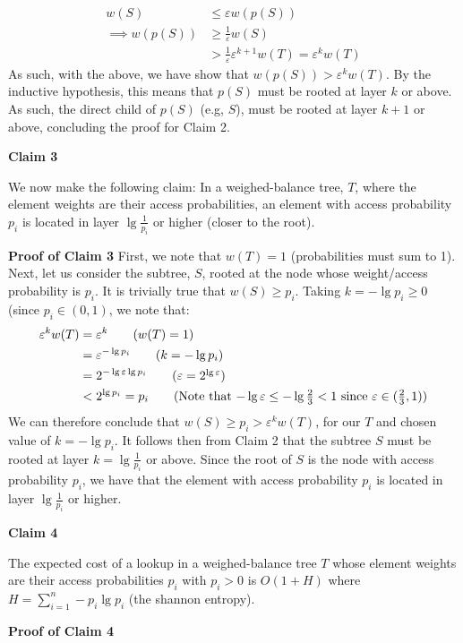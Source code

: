 \documentclass[12pt]{exam}
\newcommand*{\bigo}[1]{O \left( #1 \right)}
\newcommand*{\eps}{\varepsilon}  %
\begin{document}
\begin{questions}
\begin{solution}
\begin{align*}
  w(S) &\leq \eps w(p(S)) \tag{Claim 1 results} \\
  \implies w(p(S)) &\geq \frac{1}{\eps} w(S) \tag{Divide by $\eps$} \\
  &> \frac{1}{\eps} \eps^{k+1}w(T) = \eps^k w(T) \tag{ Definition of $S$} 
\end{align*}
As such, with the above, we have show that $w(p(S)) > \eps^k w(T)$. By the inductive hypothesis, this means that $p(S)$ must be rooted at layer $k$ or above. As such, the direct child of $p(S)$ (e.g, $S$), must be rooted at layer $k+1$ or above, concluding the proof for Claim 2.


\textbf{Claim 3}

We now make the following claim: In a weighed-balance tree, $T$, where the element weights are their access probabilities, an element with access probability $p_i$ is located in layer $\lg \frac{1}{p_i}$ or higher (closer to the root).


\textbf{Proof of Claim 3}
First, we note that $w(T) = 1$ (probabilities must sum to 1). Next, let us consider the subtree, $S$, rooted at the node whose weight/access probability is $p_i$. It is trivially true that $w(S) \geq p_i$. Taking $k = -\lg p_i \geq 0$ (since $p_i \in (0,1)$, we note that:
\begin{align*}
  \eps^{k} w(T) &= \eps^k \tag{$w(T) = 1$} \\
  &= \eps^{-\lg p_i} \tag{$k = -\lg p_i $} \\
  &= 2^{-\lg \eps \lg p_i} \tag{$\eps = 2^{\lg \eps}$} \\
  &< 2^{\lg p_i} = p_i \tag{Note that $-\lg \eps \leq -\lg \frac{2}{3} < 1$ since $\eps \in (\frac{2}{3}, 1)$}
\end{align*}
We can therefore conclude that $w(S) \geq p_i > \eps^{k} w(T)$, for our $T$ and chosen value of $k = -\lg p_i$. It follows then from Claim 2 that the subtree $S$ must be rooted at layer $k = \lg \frac{1}{p_i}$ or above. Since the root of $S$ is the node with access probability $p_i$, we have that the element with access probability $p_i$ is located in layer $\lg \frac{1}{p_i}$ or higher.


\textbf{Claim 4}

The expected cost of a lookup in a weighed-balance tree $T$ whose element weights are their access probabilities $p_i$ with $p_i > 0$ is $\bigo{1 + H}$ where $H = \sum_{i=1}^n -p_i \lg p_i$ (the shannon entropy).


\textbf{Proof of Claim 4}


\end{solution}
\end{questions}
\end{document}
